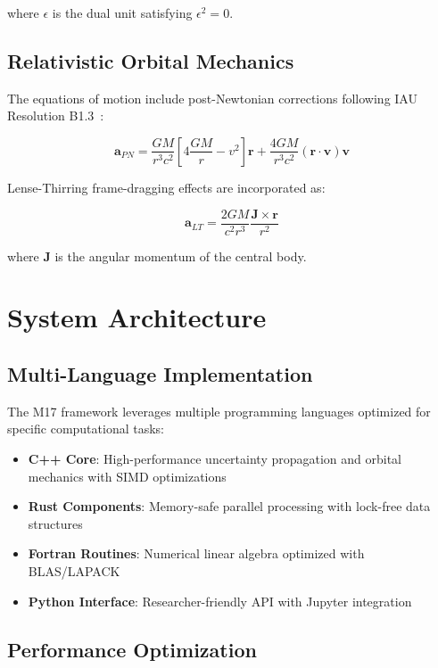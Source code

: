 \documentclass[twocolumn]{article}
\newcommand{\vect}[1]{\boldsymbol{#1}}
\begin{document}
where $\epsilon$ is the dual unit satisfying $\epsilon^2 = 0$.

\subsection{Relativistic Orbital Mechanics}

The equations of motion include post-Newtonian corrections following IAU Resolution B1.3~\cite{iau2000}:

\begin{equation}
\vect{a}_{PN} = \frac{GM}{r^3 c^2}\left[4\frac{GM}{r} - v^2\right]\vect{r} + \frac{4GM}{r^3 c^2}(\vect{r} \cdot \vect{v})\vect{v}
\label{eq:schwarzschild}
\end{equation}

Lense-Thirring frame-dragging effects are incorporated as:

\begin{equation}
\vect{a}_{LT} = \frac{2GM}{c^2 r^3}\frac{\vect{J} \times \vect{r}}{r^2}
\label{eq:lense_thirring}
\end{equation}

where $\vect{J}$ is the angular momentum of the central body.

\section{System Architecture}

\subsection{Multi-Language Implementation}

The M17 framework leverages multiple programming languages optimized for specific computational tasks:

\begin{itemize}
\item \textbf{C++ Core}: High-performance uncertainty propagation and orbital mechanics with SIMD optimizations
\item \textbf{Rust Components}: Memory-safe parallel processing with lock-free data structures  
\item \textbf{Fortran Routines}: Numerical linear algebra optimized with BLAS/LAPACK
\item \textbf{Python Interface}: Researcher-friendly API with Jupyter integration
\end{itemize}

\subsection{Performance Optimization}
\end{document}
